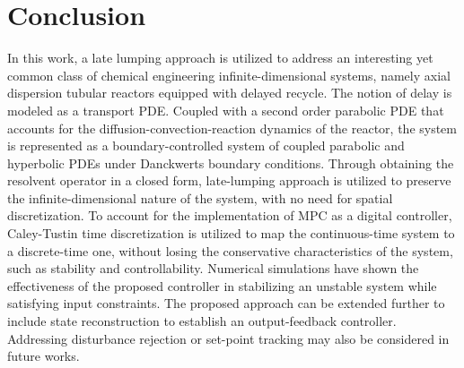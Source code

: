 \section{Conclusion}

In this work, a late lumping approach is utilized to address an interesting yet common class of chemical engineering infinite-dimensional systems, namely axial dispersion tubular reactors equipped with delayed recycle. The notion of delay is modeled as a transport PDE. Coupled with a second order parabolic PDE that accounts for the diffusion-convection-reaction dynamics of the reactor, the system is represented as a boundary-controlled system of coupled parabolic and hyperbolic PDEs under Danckwerts boundary conditions. Through obtaining the resolvent operator in a closed form, late-lumping approach is utilized to preserve the infinite-dimensional nature of the system, with no need for spatial discretization. To account for the implementation of MPC as a digital controller, Caley-Tustin time discretization is utilized to map the continuous-time system to a discrete-time one, without losing the conservative characteristics of the system, such as stability and controllability. Numerical simulations have shown the effectiveness of the proposed controller in stabilizing an unstable system while satisfying input constraints. The proposed approach can be extended further to include state reconstruction to establish an output-feedback controller. Addressing disturbance rejection or set-point tracking may also be considered in future works.